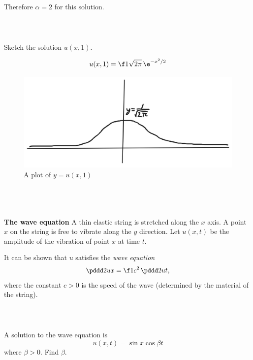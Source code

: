 \documentclass[a4paper]{article}
\begin{document}
Therefore $\alpha = 2$ for this solution.

\subsubsection{~} %

\begin{questionbody}
Sketch the solution $u(x, 1)$.
\end{questionbody}%
%
\[ u(x, 1) = \f1{\sqrt{2\pi}}\, \e^{-x^2 / 2} \]

\begin{figure}[h]
    \centering
    \includegraphics[scale=0.35]{Q1a-ii}
    \caption{A plot of $y = u(x,1)$}
\end{figure}

\subsection{~} %

\begin{questionbody}
\textbf{The wave equation} \quad
A thin elastic string is stretched along the $x$ axis. A point $x$ on the string is free to vibrate along the $y$ direction. Let $u(x, t)$ be the amplitude of the vibration of point $x$ at time $t$.

It can be shown that $u$ satisfies the \textit{wave equation} \[
\pddd 2ux = \f1{c^2}\, \pddd 2ut,
\] where the constant $c > 0$ is the speed of the wave (determined by the material of the string).
\end{questionbody}

\subsubsection{~} %

\begin{questionbody}
A solution to the wave equation is \[
u(x, t) = \sin x \cos \beta t
\] where $\beta > 0$. Find $\beta$.
\end{questionbody}
\end{document}

